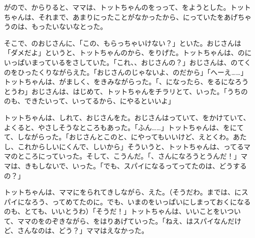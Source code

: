 がので、からりると、ママは、トットちゃんのをっって、をようとした。トットちゃんは、それまで、あまりにったことがなかったから、にっていたをあげちゃうのは、もったいないなとった。

そこで、のおじさんに、「この、もらっちゃいけない？」といた。おじさんは「ダメだよ」というと、トットちゃんのから、をりげた。トットちゃんは、のにいっぱいまっているをさしていた。「これ、、おじさんの？」おじさんは、のてくのをひったくりながらえた。「おじさんのじゃないよ、のだから」「へーえ……」トットちゃんは、がましく、をきみながらった。「、になったら、をるになろうとうわ」おじさんは、はじめて、トットちゃんをチラリとて、いった。「うちののも、できたいって、いってるから、にやるといいよ」

トットちゃんは、しれて、おじさんをた。おじさんはっていて、をかけていて、よくると、やさしそうなところもあった。「ふん……」トットちゃんは、をにてて、しながらった。「おじさんとこのと、にやってもいいけど、えとくわ。あたし、これからしいにくんで、しいから」そういうと、トットちゃんは、ってるママのところにっていった。そして、こうんだ。「、さんになろうとうんだ！」ママは、きもしないで、いった。「でも、スパイになるってってたのは、どうするの？」

トットちゃんは、ママにをられてきしながら、えた。（そうだわ。までは、にスパイになろう、ってめてたのに。でも、いまのをいっぱいにしまっておくになるのも、とても、いいとうわ）「そうだ！」トットちゃんは、いいことをいついて、ママのをのぞきながら、をはりあげていった。「ねえ、はスパイなんだけど、さんなのは、どう？」ママはえなかった。

